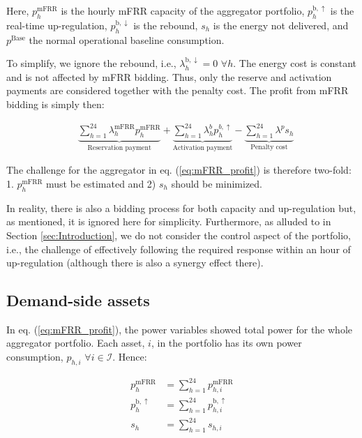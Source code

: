 \documentclass[lettersize,journal]{IEEEtran}
\begin{document}
Here, $p^{\text{mFRR}}_{h}$ is the hourly mFRR capacity of the aggregator portfolio, $p_{h}^{\text{b},\uparrow}$ is the real-time up-regulation, $p_{h}^{\text{b},\downarrow}$ is the rebound, $s_{h}$ is the energy not delivered, and $p^{\text{Base}}$ the normal operational baseline consumption.

To simplify, we ignore the rebound, i.e., $\lambda_{h}^{\text{b}, \downarrow} = 0$ $\forall{h}$. The energy cost is constant and is not affected by mFRR bidding. Thus, only the reserve and activation payments are considered together with the penalty cost. The profit from mFRR bidding is simply then:

\begin{align}\label{eq:mFRR_profit}
     & \underbrace{\sum_{h=1}^{24}\lambda_{h}^{\text{mFRR}} p^{\text{mFRR}}_{h}}_{\textrm{Reservation payment}} + \underbrace{\sum_{h=1}^{24}  \lambda_{h}^{b} p^{b,\uparrow}_{h}}_{\textrm{Activation payment}} - \underbrace{ \sum_{h=1}^{24}  \lambda^{p}s_{h}}_{\textrm{Penalty cost}}
\end{align}

The challenge for the aggregator in eq. (\ref{eq:mFRR_profit}) is therefore two-fold: 1. $p^{\text{mFRR}}_{h}$ must be estimated and 2) $s_{h}$ should be minimized.

In reality, there is also a bidding process for both capacity and up-regulation but, as mentioned, it is ignored here for simplicity. Furthermore, as alluded to in Section \ref{sec:Introduction}, we do not consider the control aspect of the portfolio, i.e., the challenge of effectively following the required response within an hour of up-regulation (although there is also a synergy effect there).

\subsection{Demand-side assets}

In eq. (\ref{eq:mFRR_profit}), the power variables showed total power for the whole aggregator portfolio. Each asset, $i$, in the portfolio has its own power consumption, $p_{h, i}$ $\forall{i} \in \mathcal{I}$. Hence:

\begin{subequations}
    \begin{align}
        p^{\text{mFRR}}_{h}        & = \sum_{h=1}^{24} p^{\text{mFRR}}_{h, i}        \\
        p^{\text{b}, \uparrow}_{h} & = \sum_{h=1}^{24} p^{\text{b}, \uparrow}_{h, i} \\
        s_{h}                      & = \sum_{h=1}^{24} s_{h, i}
    \end{align}
\end{subequations}
\end{document}
